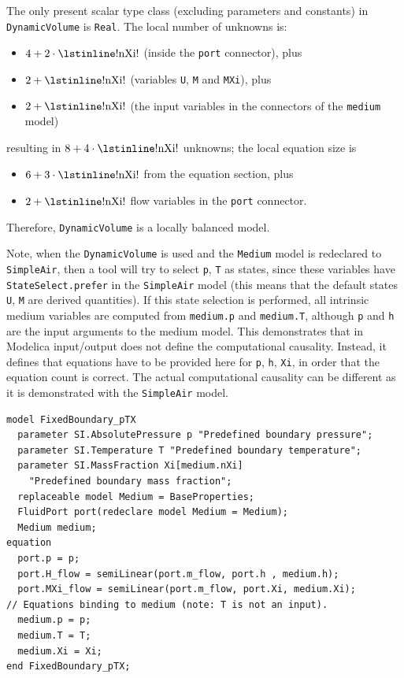 \begin{example}
The only present scalar type class (excluding parameters and constants) in \lstinline!DynamicVolume! is \lstinline!Real!.
The local number of unknowns is:
\begin{itemize}
\item
  $4 + 2 \cdot \text{\lstinline!nXi!}$ (inside the \lstinline!port! connector), plus
\item
  $2 + \text{\lstinline!nXi!}$ (variables \lstinline!U!, \lstinline!M! and \lstinline!MXi!), plus
\item
  $2 + \text{\lstinline!nXi!}$ (the input variables in the connectors of the \lstinline!medium! model)
\end{itemize}
resulting in $8 + 4 \cdot \text{\lstinline!nXi!}$ unknowns; the local equation size is
\begin{itemize}
\item
  $6 + 3 \cdot \text{\lstinline!nXi!}$ from the equation section, plus
\item
  $2 + \text{\lstinline!nXi!}$ flow variables in the \lstinline!port! connector.
\end{itemize}

Therefore, \lstinline!DynamicVolume! is a locally balanced model.

Note, when the \lstinline!DynamicVolume! is used and the \lstinline!Medium! model is redeclared to \lstinline!SimpleAir!, then a tool will try to select \lstinline!p!, \lstinline!T! as states, since these variables have \lstinline!StateSelect.prefer! in the \lstinline!SimpleAir! model (this means that the default states \lstinline!U!, \lstinline!M! are derived quantities).
If this state selection is performed, all intrinsic medium variables are computed from \lstinline!medium.p! and \lstinline!medium.T!, although \lstinline!p! and \lstinline!h! are the input arguments to the medium model.
This demonstrates that in Modelica input/output does not define the computational causality.
Instead, it defines that equations have to be provided here for \lstinline!p!, \lstinline!h!, \lstinline!Xi!, in order that the equation count is correct.
The actual computational causality can be different as it is demonstrated with the \lstinline!SimpleAir! model.

\begin{lstlisting}[language=modelica]
model FixedBoundary_pTX
  parameter SI.AbsolutePressure p "Predefined boundary pressure";
  parameter SI.Temperature T "Predefined boundary temperature";
  parameter SI.MassFraction Xi[medium.nXi]
    "Predefined boundary mass fraction";
  replaceable model Medium = BaseProperties;
  FluidPort port(redeclare model Medium = Medium);
  Medium medium;
equation
  port.p = p;
  port.H_flow = semiLinear(port.m_flow, port.h , medium.h);
  port.MXi_flow = semiLinear(port.m_flow, port.Xi, medium.Xi);
// Equations binding to medium (note: T is not an input).
  medium.p = p;
  medium.T = T;
  medium.Xi = Xi;
end FixedBoundary_pTX;
\end{lstlisting}


\end{example}
